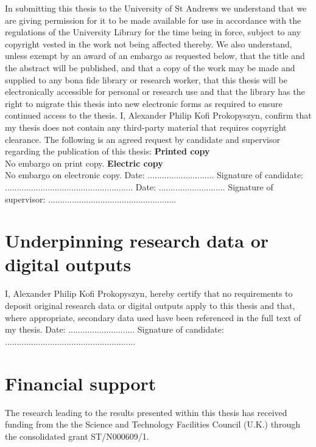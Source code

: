 \documentclass[12pt,fleqn]{report}
\numberwithin{equation}{section}
\begin{document}
In submitting this thesis to the University of St Andrews we understand that we are giving permission for it to be made available for use in accordance with the regulations of the University Library for the time being in force, subject to any copyright vested in the work not being affected thereby. We also understand, unless exempt by an award of an embargo as requested below, that the title and the abstract will be published, and that a copy of the work may be made and supplied to any bona fide library or research worker, that this thesis will be electronically accessible for personal or research use and that the library has the right to migrate this thesis into new electronic forms as required to ensure continued access to the thesis.
\vskip 0.2in
\noindent I, Alexander Philip Kofi Prokopyszyn, confirm that my thesis does not contain any third-party material that requires copyright clearance.
\vskip 0.2in
\noindent The following is an agreed request by candidate and supervisor regarding the publication of this thesis:
\vskip 0.2in
\noindent \textbf{Printed copy} \\
\noindent No embargo on print copy.
\vskip 0.2in
\noindent \textbf{Electric copy}
\noindent \\
\noindent No embargo on electronic copy.
\vskip 0.2in
\noindent Date: ............................ \quad Signature of candidate: ......................................................
\vskip 0.2in
\noindent Date: ............................ \quad Signature of supervisor: ......................................................

\newpage

\section*{Underpinning research data or digital outputs}

I, Alexander Philip Kofi Prokopyszyn, hereby certify that no requirements to deposit original research data or digital outputs apply to this thesis and that, where appropriate, secondary data used have been referenced in the full text of my thesis.
\vskip 0.2in
\noindent Date: ............................ \quad Signature of candidate: .......................................................

\vskip 0.5in

\section*{Financial support}
The research leading to the results presented within this thesis has received funding
from the the Science and Technology Facilities Council (U.K.) through the consolidated grant ST/N000609/1.
\end{document}
